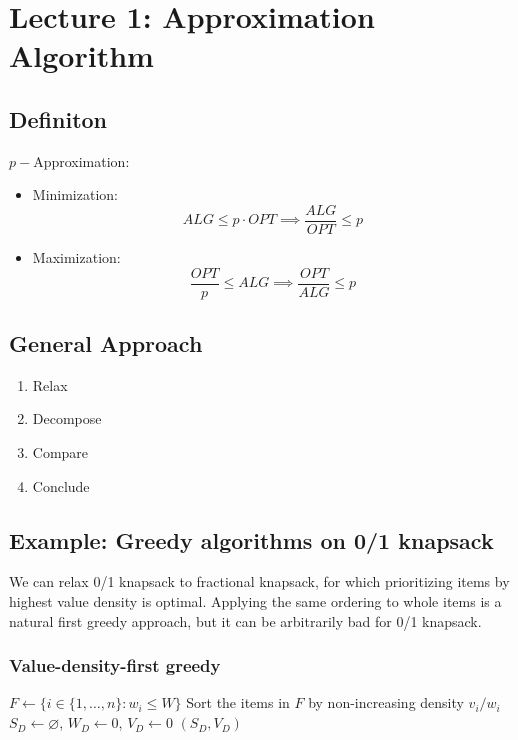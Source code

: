 \documentclass[10pt]{article}
\theoremstyle{definition}
\begin{document}
\section{Lecture 1: Approximation Algorithm}

\subsection{Definiton}
$p-$Approximation: 
\begin{itemize}
  \item Minimization: 
  \[ALG \leq p \cdot OPT \implies \frac{ALG}{OPT} \leq p\]
  \item Maximization:
  \[\frac{OPT}{p} \leq ALG \implies \frac{OPT}{ALG} \leq p\]
\end{itemize}
\subsection{General Approach}
\begin{enumerate}
  \item Relax
  \item Decompose
  \item Compare 
  \item Conclude
\end{enumerate}

\subsection{Example: Greedy algorithms on 0/1 knapsack}
We can relax 0/1 knapsack to fractional knapsack, for which prioritizing items by highest value density is optimal. Applying the same ordering to whole items is a natural first greedy approach, but it can be arbitrarily bad for 0/1 knapsack.

\subsubsection*{Value-density-first greedy}
\begin{algorithm}[H]
  \caption{Value-density-first greedy for 0/1 knapsack}
  $F \gets \{i \in \{1,\ldots,n\}:w_i\leq W\}$\;
  Sort the items in $F$ by non-increasing density $v_i/w_i$\;
  $S_D \gets \varnothing$, $W_D \gets 0$, $V_D \gets 0$\;
  \Return $(S_D,V_D)$\;
\end{algorithm}
\end{document}
